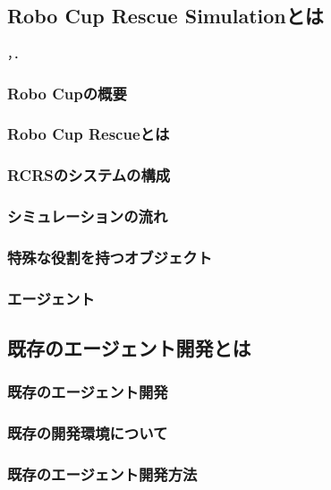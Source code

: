 \newcommand{\rcrs}{Robo Cup Rescue Simulation}

\chapter{}

\thispagestyle{myheadings}

\section{\rcrs とは}
，．


\subsection{Robo Cupの概要}

\subsection{Robo Cup Rescueとは}
\subsection{RCRSのシステムの構成}
\subsection{シミュレーションの流れ}
\subsection{特殊な役割を持つオブジェクト}
\subsection{エージェント}


\section{既存のエージェント開発とは}
\subsection{既存のエージェント開発}
\subsection{既存の開発環境について}
\subsection{既存のエージェント開発方法}
